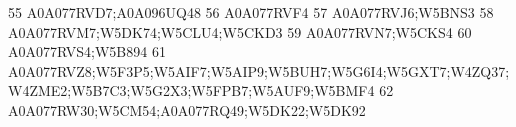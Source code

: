 \documentclass{beamer}
\begin{document}
\begin{frame}[fragile]
\begin{itemize}
\begin{Schunk}
\begin{Soutput}
55                                                                                                                                                                                                                                                                                                                                                          A0A077RVD7;A0A096UQ48
56                                                                                                                                                                                                                                                                                                                                                                     A0A077RVF4
57                                                                                                                                                                                                                                                                                                                                                              A0A077RVJ6;W5BNS3
58                                                                                                                                                                                                                                                                                                                                                A0A077RVM7;W5DK74;W5CLU4;W5CKD3
59                                                                                                                                                                                                                                                                                                                                                              A0A077RVN7;W5CKS4
60                                                                                                                                                                                                                                                                                                                                                              A0A077RVS4;W5B894
61                                                                                                                                                                                                                                                                          A0A077RVZ8;W5F3P5;W5AIF7;W5AIP9;W5BUH7;W5G6I4;W5GXT7;W4ZQ37;W4ZME2;W5B7C3;W5G2X3;W5FPB7;W5AUF9;W5BMF4
62                                                                                                                                                                                                                                                                                                                                     A0A077RW30;W5CM54;A0A077RQ49;W5DK22;W5DK92

\end{Soutput}
\end{Schunk}
\end{itemize}
\end{frame}
\end{document}
